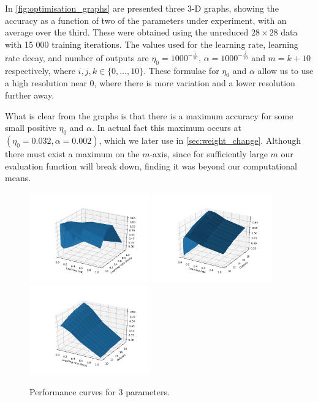 \documentclass[a4paper, 11pt, twocolumn, final]{article} %
\begin{document}
In \autoref{fig:optimisation_graphs} are presented three 3-D graphs, showing the
accuracy as a function of two of the parameters under experiment, with an
average over the third.  These were obtained using the unreduced $28 \times 28$
data with 15 000 training iterations.  The values used for the learning rate,
learning rate decay, and number of outputs are $\eta_0 = 1000^{-\frac{i}{10}}$,
$\alpha = 1000^{-\frac{j}{10}}$ and $m = k + 10$ respectively, where $i, j, k
\in \{0, \ldots, 10\}$.  These formulae for $\eta_0$ and $\alpha$ allow us to
use a high resolution near 0, where there is more variation and a lower
resolution further away.

What is clear from the graphs is that there is a maximum accuracy for some small
positive $\eta_0$ and $\alpha$.  In actual fact this maximum occurs at $(\eta_0 =
0.032, \alpha = 0.002)$, which we later use in \autoref{sec:weight_change}.
Although there must exist a maximum on the $m$-axis, since for sufficiently
large $m$ our evaluation function will break down, finding it was beyond our
computational means.

\begin{figure}
  \includegraphics[width=0.46\textwidth]{optimisation/01.png}
  \includegraphics[width=0.46\textwidth]{optimisation/02.png}
  \includegraphics[width=0.46\textwidth]{optimisation/12.png}
  \caption{Performance curves for 3 parameters.}
  \label{fig:optimisation_graphs}
\end{figure}
\end{document}
